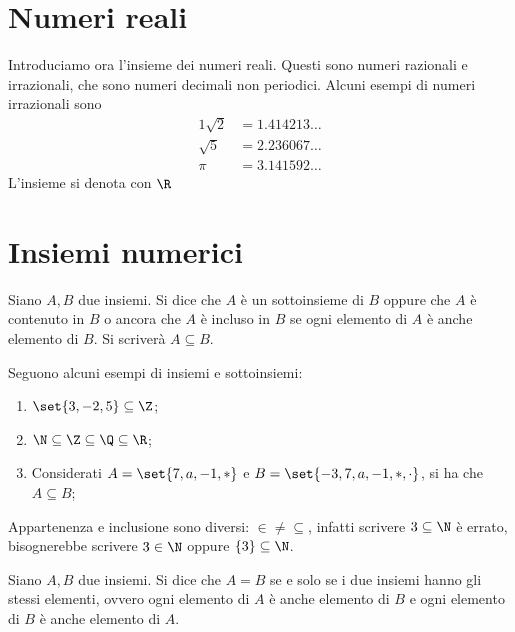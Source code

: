 \section{Numeri reali}
Introduciamo ora l'insieme dei numeri reali. Questi sono numeri razionali e irrazionali, che sono numeri decimali non periodici. Alcuni esempi di numeri irrazionali sono
\begin{alignat*}{1}
        \sqrt{2} &= 1.414213 \dotsc \\
        \sqrt{5} &= 2.236067 \dotsc \\
             \pi &= 3.141592 \dotsc
\end{alignat*}
L'insieme si denota con \(\R\)


\section{Insiemi numerici}\label{sec:insiemi_numerici}
\begin{definition}\label{def:sottoinsieme_improprio}
    Siano \(A,B\) due insiemi. Si dice che \(A\) è un sottoinsieme di \(B\) oppure che \(A\) è contenuto in \(B\) o ancora che \(A\) è incluso in \(B\) se ogni elemento di \(A\) è anche elemento di \(B\). Si scriverà \(A \subseteq B\).
\end{definition}

\begin{examples}
    Seguono alcuni esempi di insiemi e sottoinsiemi:
        \begin{enumerate}
            \item \(\set{3, -2, 5} \subseteq \Z\);
            \item \(\N \subseteq \Z \subseteq \Q \subseteq \R\);
            \item Considerati \(A = \set{7, a, -1, *}\) e \(B = \set{-3, 7, a, -1, *, \cdot}\), si ha che \(A \subseteq B\);
        \end{enumerate}
\end{examples}

\begin{remark}
    Appartenenza e inclusione sono diversi: \(\in \mathop{\neq} \subseteq\), infatti scrivere \(3 \subseteq \N\) è errato, bisognerebbe scrivere \(3 \in \N\) oppure \(\{3\} \subseteq \N\).
\end{remark}


\begin{definition}\label{def:insiemi_uguali}
    Siano \(A,B\) due insiemi. Si dice che \(A = B\) se e solo se i due insiemi hanno gli stessi elementi, ovvero ogni elemento di \(A\) è anche elemento di \(B\) e ogni elemento di \(B\) è anche elemento di \(A\).
\end{definition}

